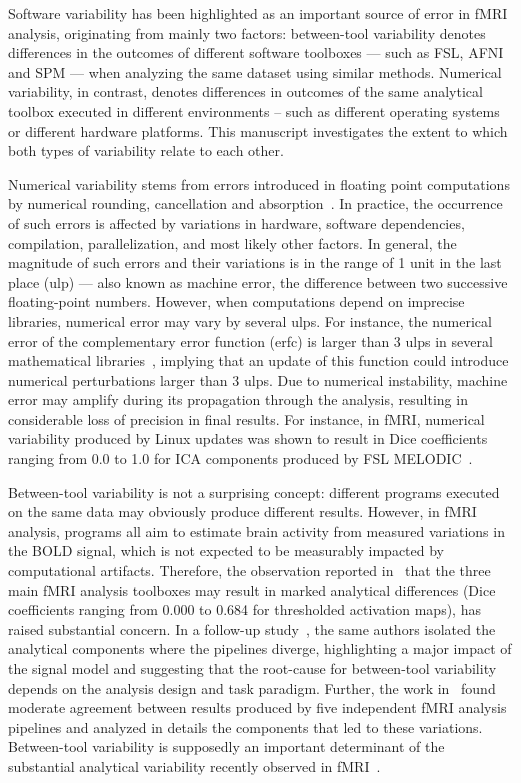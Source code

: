 \documentclass[11pt,onecolumn]{article}
\begin{document}
Software variability has been highlighted as an important source of error
in fMRI analysis, originating from mainly two factors: between-tool
variability denotes differences in the outcomes of different
software toolboxes --- such as FSL, AFNI and SPM --- when analyzing the same dataset
using similar methods. Numerical variability, in contrast, denotes
differences in outcomes of the same analytical toolbox
executed in different environments – such as different operating systems or
different hardware platforms. This manuscript investigates the extent to
which both types of variability relate to each other.

Numerical variability stems from errors introduced in floating point
computations by numerical rounding, cancellation and absorption~\cite{muller2018handbook}. In
practice, the occurrence of such errors is affected by variations in
hardware, software dependencies, compilation, parallelization, and most
likely other factors. In general, the magnitude of such errors and their
variations is in the range of 1 unit in the last place (ulp) --- also known
as machine error, the difference between two successive floating-point
numbers. However, when computations depend on imprecise libraries,
numerical error may vary by several ulps. For instance, the numerical error
of the complementary error function (erfc) is larger than 3 ulps in several
mathematical libraries~\cite{zimmermann:hal-03141101}, implying that an update of this function could introduce
numerical perturbations larger than 3 ulps. Due to numerical instability,
machine error may amplify during its propagation through the analysis,
resulting in considerable loss of precision in final results. For instance, in fMRI,
numerical variability produced by Linux updates was shown to result in Dice
coefficients ranging from 0.0 to 1.0 for ICA components produced by FSL
MELODIC~\cite{Glatard2015}.

Between-tool variability is not a surprising concept: different programs
executed on the same data may obviously produce different results. However,
in fMRI analysis, programs all aim to estimate brain activity from measured
variations in the BOLD signal, which is not expected to be measurably
impacted by computational artifacts. Therefore, the observation reported
in~\cite{bowring2019exploring} that the three main fMRI analysis toolboxes
may result in marked analytical differences (Dice coefficients ranging from
0.000 to 0.684 for thresholded activation maps), has raised substantial
concern. In a follow-up study~\cite{bowring2021isolating}, the same authors
isolated the analytical components where the pipelines diverge,
highlighting a major impact of the signal model and suggesting that the
root-cause for between-tool variability depends on the analysis design and
task paradigm. Further, the work in~\cite{Li2021.12.01.470790} found
moderate agreement between results produced by five independent fMRI
analysis pipelines and analyzed in details the components that led to these
variations. Between-tool variability is supposedly an important determinant
of the substantial analytical variability recently observed in
fMRI~\cite{botvinik2020variability}.
\end{document}
